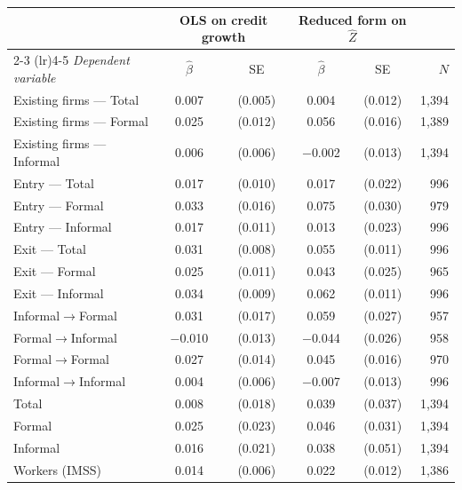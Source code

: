 \begin{threeparttable}
    \begin{tabular}{lccccr}
        \toprule
        & \multicolumn{2}{c}{\textbf{OLS on credit growth}} & \multicolumn{2}{c}{\textbf{Reduced form on $\hat{Z}$}} & \\
        \cmidrule(lr){2-3} \cmidrule(lr){4-5}
        \textit{Dependent variable} & $\widehat{\beta}$ & SE & $\widehat{\beta}$ & SE & $N$ \\
        \midrule
        Existing firms --- Total    & 0.007 & (0.005) & 0.004 & (0.012) & 1{,}394 \\
        Existing firms --- Formal   & 0.025\sym{**} & (0.012) & 0.056\sym{***} & (0.016) & 1{,}389 \\
        Existing firms --- Informal & 0.006 & (0.006) & $-$0.002 & (0.013) & 1{,}394 \\
        Entry --- Total             & 0.017\sym{*} & (0.010) & 0.017 & (0.022) & 996 \\
        Entry --- Formal            & 0.033\sym{**} & (0.016) & 0.075\sym{**} & (0.030) & 979 \\
        Entry --- Informal          & 0.017 & (0.011) & 0.013 & (0.023) & 996 \\
        Exit --- Total              & 0.031\sym{***} & (0.008) & 0.055\sym{***} & (0.011) & 996 \\
        Exit --- Formal             & 0.025\sym{**} & (0.011) & 0.043\sym{*} & (0.025) & 965 \\
        Exit --- Informal           & 0.034\sym{***} & (0.009) & 0.062\sym{***} & (0.011) & 996 \\
        \midrule
        Informal$\to$Formal & 0.031\sym{*} & (0.017) & 0.059\sym{**} & (0.027) & 957 \\
        Formal$\to$Informal & $-$0.010 & (0.013) & $-$0.044\sym{*} & (0.026) & 958 \\
        Formal$\to$Formal   & 0.027\sym{**} & (0.014) & 0.045\sym{***} & (0.016) & 970 \\
        Informal$\to$Informal & 0.004 & (0.006) & $-$0.007 & (0.013) & 996 \\
        \midrule
        Total    & 0.008 & (0.018) & 0.039 & (0.037) & 1{,}394 \\
        Formal   & 0.025 & (0.023) & 0.046 & (0.031) & 1{,}394 \\
        Informal & 0.016 & (0.021) & 0.038 & (0.051) & 1{,}394 \\
        \midrule
        Workers (IMSS)   & 0.014\sym{**} & (0.006) & 0.022\sym{*} & (0.012) & 1{,}386 \\

\end{tabular}
\end{threeparttable}
